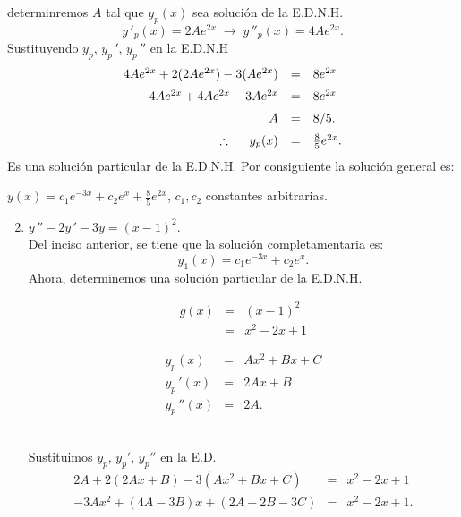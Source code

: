 \documentclass[9pt]{beamer}
\begin{document}
\begin{frame}[t]
	\begin{exampleblock}{}
		determinremos \(A\) tal que \(y_p(x)\) sea solución de la E.D.N.H.
		\[
			y\,'_p(x) = 2Ae^{2x} \; \longrightarrow \; y\,'' _p(x) = 4Ae^{2x}.
		\]
		Sustituyendo \(y_p\), \(y_p\,'\), \(y_p\,''\) en la E.D.N.H
		\[
			\begin{array}{rcl}
				4Ae^{2x} + 2(2Ae^{2x}) -3(Ae^{2x}) & = & 8e^{2x} \\[2mm]
				4Ae^{2x} + 4Ae^{2x} - 3Ae^{2x} & = & 8e^{2x} \\[2mm]
				A & = & 8/5. \\[2mm]
				\therefore \hspace{5mm} y_p(x) & = & \frac 85e^{2x} .
			\end{array}
		\]
		Es una solución particular de la E.D.N.H. Por consiguiente la solución general es:
		\begin{center}
			\color{red} \underline{\color{black} \(y(x) = c_1e^{-3x} + c_2e^{x} + \frac 85e^{2x}\)}\color{black}, \(c_1,c_2\) constantes arbitrarias.
		\end{center}
	\end{exampleblock}
\end{frame}

\begin{frame}[t]
	\begin{exampleblock}{}
		\begin{enumerate}
			\setcounter{enumi}{1}
		\item \(y\,'' -2y\,' -3y = (x-1) ^2\). \\[2mm]
			Del inciso anterior, se tiene que la solución completamentaria es:
				\[
					y_1(x) = c_1e^{-3x} + c_2e^x.
				\]
				Ahora, determinemos una solución particular de la E.D.N.H.
				\begin{minipage}{0.5\linewidth}
					\[
						\begin{array}{rcl}
							g(x) & = & (x-1) ^2 \\[2mm]
							& = & x^2-2x+1
						\end{array}
					\]
				\end{minipage}
				\begin{minipage}{0.4\linewidth}
					\[
						\begin{array}{rcl}
							y_p(x) & = & Ax^2+Bx+C \\[2mm]
							y_p\,'(x) & = & 2Ax+B \\[2mm]
							y_p\,''(x) & = & 2A.
						\end{array}
					\]
				\end{minipage}\\
				Sustituimos \(y_p\), \(y_p'\), \(y_p''\) en la E.D.
				\[
					\begin{array}{rcl}
						2A+2(2Ax+B) -3(Ax^2+Bx+C) & = & x^2-2x+1 \\[2mm]
						-3Ax^2+(4A-3B) x+(2A+2B-3C) & = & x^2-2x+1.
					\end{array}
				\]
		\end{enumerate}
	\end{exampleblock}
\end{frame}
\end{document}
